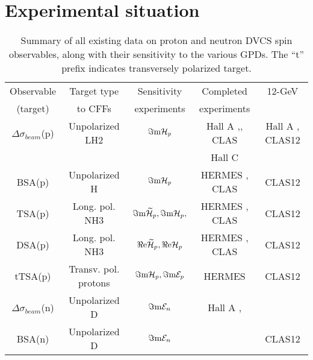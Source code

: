 \documentclass[12pt, letterpaper]{article}
\begin{document}

\section{Experimental situation}\label{sec_exp_situation}


\begin{table}[t]
   \centering
   \begin{tabular}{|c|c|c|c|c|} 
\hline
Observable & Target type & Sensitivity & Completed & 12-GeV \\
(target) & to CFFs & experiments & experiments \\
\hline
\hline
    $\Delta\sigma_{beam}$(p) & Unpolarized LH2 & $\Im{\rm m}{\cal H}_p$ & Hall A \cite{carlos},\cite{E07007}, CLAS \cite{hs} &   Hall A \cite{E1206114}, CLAS12 \cite{E1206119}\\ 
& & &Hall C \cite{E1213010}\\

\hline
    BSA(p)     &  Unpolarized H &  $\Im{\rm m}{\cal H}_p$       & HERMES \cite{hermes}, CLAS \cite{stepan,fx,pisano}   & CLAS12 \cite{E1206119} \\
\hline 
   TSA(p)   &  Long. pol. NH3 &  $\Im{\rm m}\widetilde{\cal H}_p,\Im{\rm m}{\cal H}_p,$     &  HERMES \cite{hermes}, CLAS \cite{shifeng,erin,pisano} & CLAS12 \cite{E1206119}\\
\hline 
    DSA(p)    &  Long. pol. NH3 &  $\Re{\rm e}\widetilde{\cal H}_p,\Re{\rm e}{\cal H}_p$     &  HERMES \cite{hermes}, CLAS \cite{pisano}& CLAS12 \cite{E1206119}\\
\hline 
    tTSA(p)    &   Transv. pol. protons & $\Im{\rm m}{\cal H}_p,\Im{\rm m}{\cal E}_p$               &  HERMES \cite{hermes} &  CLAS12 \cite{E1212010}\\
\hline
    $\Delta\sigma_{beam}$(n)    &  Unpolarized D & $\Im{\rm m}{\cal E}_n$       &  Hall A \cite{malek},\cite{E08025}\footnotemark[\value{footnote}] & \\
\hline
    BSA(n)    &   Unpolarized D & $\Im{\rm m}{\cal E}_n$       &   & CLAS12 \cite{proposal}\\
\hline
   \end{tabular}
   \caption[Summary of existing and proposed DVCS experiments]
   {Summary of all existing data on proton and neutron DVCS spin observables, along with their sensitivity to the various GPDs. The ``t'' prefix indicates transversely polarized target.}\label{dvcs_exp_summary}
\end{table}
\end{document}
